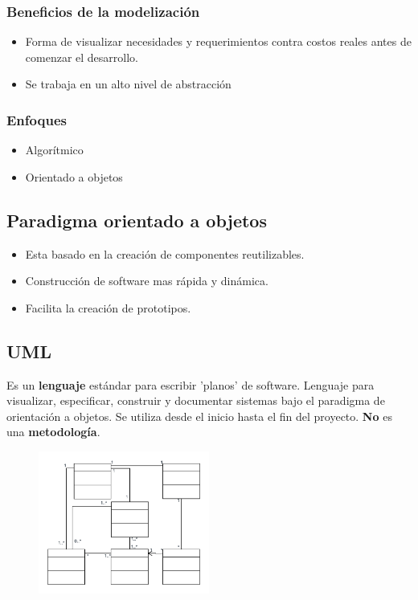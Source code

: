 \documentclass[titlepage,a4paper]{article}
\begin{document}
\subsubsection{Beneficios de la modelización}
    \begin{itemize}
        \item Forma de visualizar necesidades y requerimientos contra costos reales antes de comenzar el desarrollo.
        \item Se trabaja en un alto nivel de abstracción
    \end{itemize}


\subsubsection*{Enfoques}
    \begin{itemize}
        \item Algorítmico
        \item Orientado a objetos
    \end{itemize}

\subsection{Paradigma orientado a objetos}
    \begin{itemize}
        \item Esta basado en la creación de componentes reutilizables.
        \item Construcción de software mas rápida y dinámica.
        \item Facilita la creación de prototipos.
    \end{itemize}

\subsection{UML}
Es un \textbf{lenguaje} estándar para escribir 'planos' de software. Lenguaje para visualizar, especificar, construir y documentar sistemas bajo el paradigma de orientación a objetos. Se utiliza desde el inicio hasta el fin del proyecto.
\textbf{No} es una \textbf{metodología}.

    \begin{figure}[!htb]
        \centering
        \includegraphics[width=0.5\textwidth]{Imagenes/UML.png}
    \end{figure}
\end{document}
